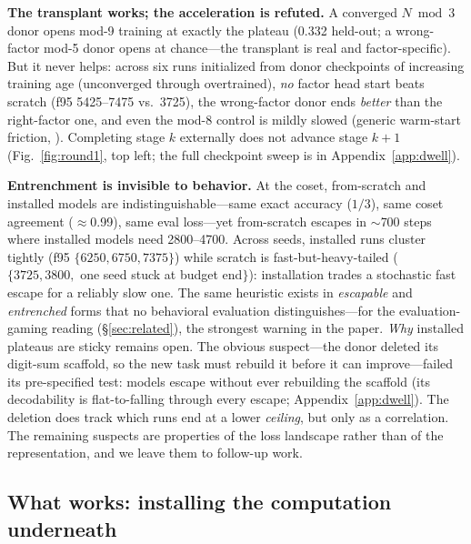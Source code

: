 \documentclass{article} %
\begin{document}
\textbf{The transplant works; the acceleration is refuted.} A converged $N \bmod 3$ donor opens mod-9 training at exactly the plateau (0.332 held-out; a wrong-factor mod-5 donor opens at chance---the transplant is real and factor-specific). But it never helps: across six runs initialized from donor checkpoints of increasing training age (unconverged through overtrained), \emph{no} factor head start beats scratch (f95 5425--7475 vs.\ 3725), the wrong-factor donor ends \emph{better} than the right-factor one, and even the mod-8 control is mildly slowed (generic warm-start friction, \citealp{ash2020warm}). Completing stage $k$ externally does not advance stage $k{+}1$ (Fig.~\ref{fig:round1}, top left; the full checkpoint sweep is in Appendix~\ref{app:dwell}).

\textbf{Entrenchment is invisible to behavior.} At the coset, from-scratch and installed models are indistinguishable---same exact accuracy ($1/3$), same coset agreement ($\approx$0.99), same eval loss---yet from-scratch escapes in $\sim$700 steps where installed models need 2800--4700. Across seeds, installed runs cluster tightly (f95 $\{6250, 6750, 7375\}$) while scratch is fast-but-heavy-tailed ($\{3725, 3800,$ one seed stuck at budget end$\}$): installation trades a stochastic fast escape for a reliably slow one. The same heuristic exists in \emph{escapable} and \emph{entrenched} forms that no behavioral evaluation distinguishes---for the evaluation-gaming reading (\S\ref{sec:related}), the strongest warning in the paper. \emph{Why} installed plateaus are sticky remains open. The obvious suspect---the donor deleted its digit-sum scaffold, so the new task must rebuild it before it can improve---failed its pre-specified test: models escape without ever rebuilding the scaffold (its decodability is flat-to-falling through every escape; Appendix~\ref{app:dwell}). The deletion does track which runs end at a lower \emph{ceiling}, but only as a correlation. The remaining suspects are properties of the loss landscape rather than of the representation, and we leave them to follow-up work.

\subsection{What works: installing the computation underneath}
\end{document}
